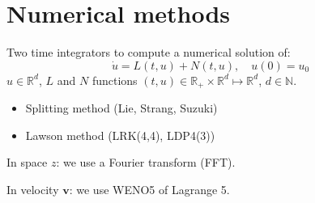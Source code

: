 \documentclass{beamer}
\newcommand{\Mvb}[1]{\boldsymbol{#1}}
\begin{document}
\section{Numerical methods}
\begin{frame}
  Two time integrators to compute a numerical solution of:
  $$
    \dot{u} = L(t,u) + N(t,u),\quad u(0) = u_0
  $$
  $u\in\mathbb{R}^d$, $L$ and $N$ functions $(t,u)\in\mathbb{R}_+\times\mathbb{R}^d\mapsto\mathbb{R}^d$, $d\in\mathbb{N}$.
  \vfill
  \begin{itemize}
    \item Splitting method (Lie, Strang, Suzuki)
    \item Lawson method (LRK(4,4), LDP4(3))
  \end{itemize}
  \vfill
  
  In space $z$: we use a Fourier transform (FFT).

  In velocity $\Mvb{v}$: we use WENO5 of Lagrange 5.
\end{frame}
\end{document}
